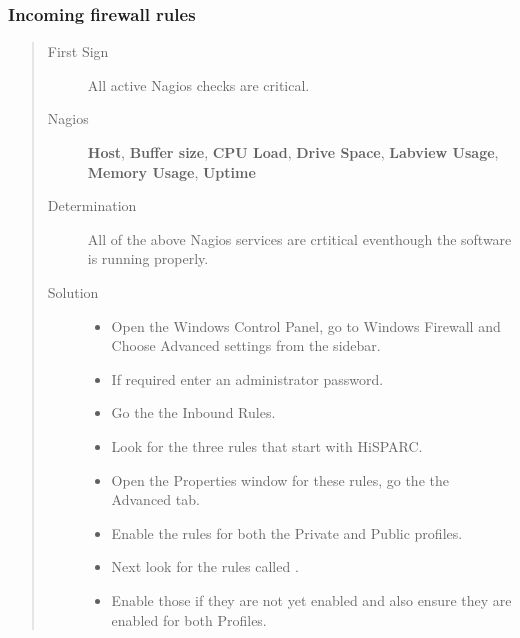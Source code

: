 \documentclass[a4paper,11pt,english]{sphinxmanual}
\begin{document}
\subsubsection{Incoming firewall rules}
\label{known-issues:incoming-firewall-rules}\begin{quote}\begin{description}
\item[{First Sign}] \leavevmode
All active Nagios checks are critical.

\item[{Nagios}] \leavevmode
\textbf{Host}, \textbf{Buffer size}, \textbf{CPU Load}, \textbf{Drive Space},
\textbf{Labview Usage}, \textbf{Memory Usage}, \textbf{Uptime}

\item[{Determination}] \leavevmode
All of the above Nagios services are crtitical eventhough
the software is running properly.

\item[{Solution}] \leavevmode\begin{itemize}
\item {} 
Open the Windows Control Panel, go to Windows Firewall and
Choose Advanced settings from the sidebar.

\item {} 
If required enter an administrator password.

\item {} 
Go the the Inbound Rules.

\item {} 
Look for the three rules that start with HiSPARC.

\item {} 
Open the Properties window for these rules, go the the Advanced tab.

\item {} 
Enable the rules for both the Private and Public profiles.

\item {} 
Next look for the rules called
.

\item {} 
Enable those if they are not yet enabled and also ensure they
are enabled for both Profiles.

\end{itemize}

\end{description}\end{quote}
\end{document}
